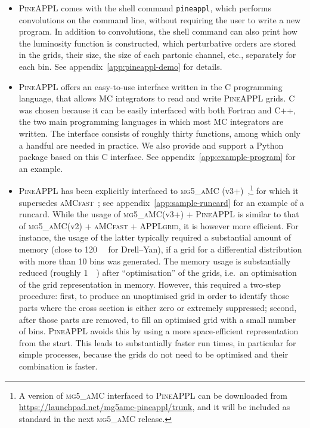 \begin{itemize}

\item \textsc{PineAPPL} comes with the shell command \texttt{pineappl}, which performs convolutions on the command line, without requiring the user to write a new program.
In addition to convolutions, the shell command can also print how the luminosity function is constructed, which perturbative orders are stored in the grids, their size, the size of each partonic channel, etc., separately for each bin. See appendix~\ref{app:pineappl-demo} for details.
  
\item \textsc{PineAPPL} offers an easy-to-use interface written in the C programming language, that allows MC integrators to read and write \textsc{PineAPPL} grids.
C was chosen because it can be easily interfaced with both Fortran and C++, the two main programming languages in which most MC integrators are written.
The interface consists of roughly thirty functions, among which only a handful are needed in practice.
We also provide and support a Python package based on this C interface.
See appendix~\ref{app:example-program} for an example.

\item \textsc{PineAPPL} has been explicitly interfaced to \textsc{mg5\_aMC} (v3+)~\cite{Alwall:2014hca,Frederix:2018nkq},\footnote{A version of \textsc{mg5\_aMC} interfaced to \textsc{PineAPPL} can be downloaded from \url{https://launchpad.net/mg5amc-pineappl/trunk}, and it will be included as standard in the next \textsc{mg5\_aMC} release.} for which it supersedes \textsc{aMCfast}~\cite{Bertone:2014zva}; see appendix~\ref{app:sample-runcard} for an example of a runcard. While the usage of
\textsc{mg5\_aMC}(v3+) + \textsc{PineAPPL} is similar to that of 
\textsc{mg5\_aMC}(v2) + \textsc{aMCfast} + \textsc{APPLgrid}, it is however more
efficient. For instance, the usage of the latter typically required a substantial amount of memory (close to \SI{120}{\giga\byte} for Drell--Yan), if a grid for a differential distribution with more than 10 bins was generated.
The memory usage is substantially reduced (roughly \SI{1}{\giga\byte}) after \enquote{optimisation} of the grids, i.e.\ an optimisation of the grid representation in memory.
However, this required a two-step procedure: first, to produce an unoptimised grid in order to identify those parts where the cross section is either zero or extremely suppressed; second, after those parts are removed, to fill an optimised grid with a small number of bins.
\textsc{PineAPPL} avoids this by using a more space-efficient representation from the start. This leads to substantially faster run times, in particular for simple processes, because the grids do not need to be optimised 
and their combination is faster.

\end{itemize}


